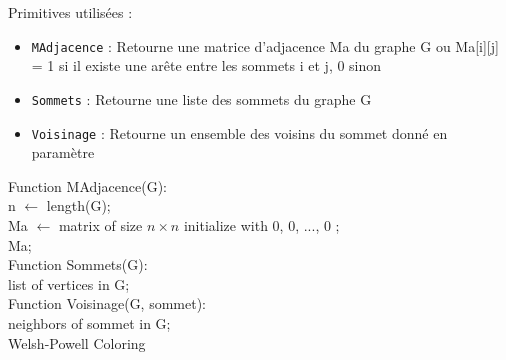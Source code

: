 \documentclass{report}
\begin{document}
\hspace{-4em}Primitives utilisées :
\begin{itemize}
  \item \texttt{MAdjacence} : Retourne une matrice d'adjacence Ma du graphe G ou Ma[i][j] = 1 si il existe une arête entre les sommets i et j, 0 sinon
  \item \texttt{Sommets} : Retourne une liste des sommets du graphe G
  \item \texttt{Voisinage} : Retourne un ensemble des voisins du sommet donné en paramètre
\end{itemize}
\begin{algorithm}[H]

    \SetAlgoLined
    \SetNoFillComment
    Function MAdjacence(G):\\ 
    \hspace{2em} n $\leftarrow$ length(G);\\
    \hspace{2em} Ma $\leftarrow$ matrix of size $n \times n$ initialize with  {0, 0, ..., 0} ;\\
    \hspace{2em} 
        \hspace{2em}\Return Ma;\\

    Function Sommets(G):\\
    \hspace{2em}\Return list of vertices in G;\\
    Function Voisinage(G, sommet):\\
    \hspace{2em}\Return neighbors of sommet in G;\\
        \caption{Welsh-Powell Coloring}

\end{algorithm}
\end{document}
